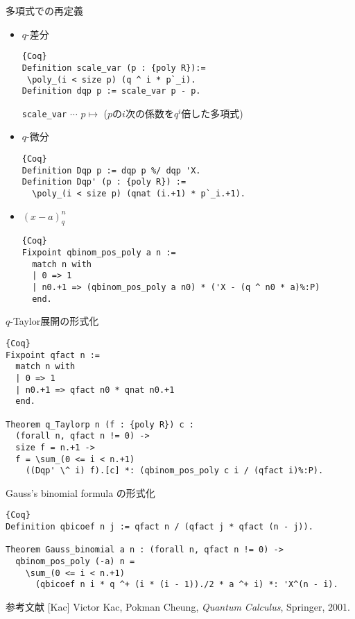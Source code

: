 \documentclass[unicode,mathserif]{beamer}
\begin{document}
\begin{frame}[fragile]
\begin{columns}[T]
\begin{column}{0.33\columnwidth}
		\begin{block}{多項式での再定義}
			\begin{itemize}
			\item $q$-差分
			\begin{lstlisting}{Coq}
Definition scale_var (p : {poly R}):=
 \poly_(i < size p) (q ^ i * p`_i).
Definition dqp p := scale_var p - p. \end{lstlisting}
{\tt scale\_var} $\cdots$ $p \mapsto$ ($p$の$i$次の係数を$q^i$倍した多項式)
			\item $q$-微分
			\begin{lstlisting}{Coq}
Definition Dqp p := dqp p %/ dqp 'X.
Definition Dqp' (p : {poly R}) :=
  \poly_(i < size p) (qnat (i.+1) * p`_i.+1). \end{lstlisting}
			\item $(x - a)^n_q$
			\begin{lstlisting}{Coq}
Fixpoint qbinom_pos_poly a n :=
  match n with
  | 0 => 1
  | n0.+1 => (qbinom_pos_poly a n0) * ('X - (q ^ n0 * a)%:P)
  end. \end{lstlisting}
  			\end{itemize}
		\end{block}

		\begin{block}{$q$-Taylor展開の形式化}
			\begin{lstlisting}{Coq}
Fixpoint qfact n :=
  match n with
  | 0 => 1
  | n0.+1 => qfact n0 * qnat n0.+1
  end.

Theorem q_Taylorp n (f : {poly R}) c :
  (forall n, qfact n != 0) ->
  size f = n.+1 ->
  f = \sum_(0 <= i < n.+1)
    ((Dqp' \^ i) f).[c] *: (qbinom_pos_poly c i / (qfact i)%:P).
\end{lstlisting}
		\end{block}
		
		\begin{block}{Gauss's binomial formula の形式化}
			\begin{lstlisting}{Coq}
Definition qbicoef n j := qfact n / (qfact j * qfact (n - j)).

Theorem Gauss_binomial a n : (forall n, qfact n != 0) ->
  qbinom_pos_poly (-a) n =
    \sum_(0 <= i < n.+1)
      (qbicoef n i * q ^+ (i * (i - 1))./2 * a ^+ i) *: 'X^(n - i). \end{lstlisting}
		\end{block}

		\begin{block}{参考文献}
			[Kac] Victor Kac, Pokman Cheung, {\it{Quantum Calculus}}, Springer, 2001.
		\end{block}
			
	\end{column}
	\end{columns}
\end{frame}
\end{document}
